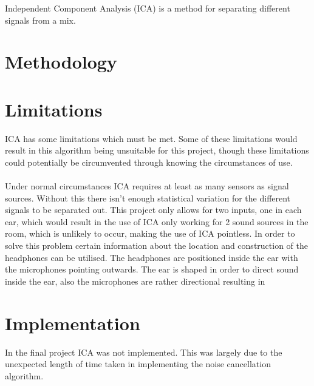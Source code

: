 \label{appendix:ica}
Independent Component Analysis (ICA) is a method for separating different signals from a mix.

\section{Methodology}

\section{Limitations}
ICA has some limitations which must be met.
Some of these limitations would result in this algorithm being unsuitable for this project, though these limitations could potentially be circumvented through knowing the circumstances of use.
\\
\\
Under normal circumstances ICA requires at least as many sensors as signal sources.
Without this there isn't enough statistical variation for the different signals to be separated out.
This project only allows for two inputs, one in each ear, which would result in the use of ICA only working for 2 sound sources in the room, which is unlikely to occur, making the use of ICA pointless.
In order to solve this problem certain information about the location and construction of the headphones can be utilised.
The headphones are positioned inside the ear with the microphones pointing outwards.
The ear is shaped in order to direct sound inside the ear, also the microphones are rather directional resulting in 

\section{Implementation}
In the final project ICA was not implemented.
This was largely due to the unexpected length of time taken in implementing the noise cancellation algorithm.
